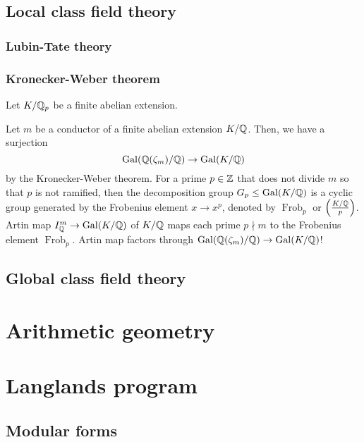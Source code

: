 \documentclass{../note}
\DeclareMathOperator{\Frob}{Frob}
\begin{document}
\chapter{Local class field theory}
\section{Lubin-Tate theory}
\section{Kronecker-Weber theorem}
\begin{prb}
Let $K/\mathbb{Q}_p$ be a finite abelian extension.

\end{prb}







Let $m$ be a conductor of a finite abelian extension $K/\mathbb{Q}$.
Then, we have a surjection
\[\operatorname{Gal}(\mathbb{Q}(\zeta_m)/\mathbb{Q})\to\operatorname{Gal}(K/\mathbb{Q})\]
by the Kronecker-Weber theorem.
For a prime $p\in\mathbb{Z}$ that does not divide $m$ so that $p$ is not ramified, then the decomposition group $G_p\le\operatorname{Gal}(K/\mathbb{Q})$ is a cyclic group generated by the Frobenius element $x\to x^p$, denoted by $\Frob_p$ or $\left(\frac{K/\mathbb{Q}}p\right)$.
Artin map $I_{\mathbb{Q}}^m\to\operatorname{Gal}(K/\mathbb{Q})$ of $K/\mathbb{Q}$ maps each prime $p\nmid m$ to the Frobenius element $\Frob_p$.
Artin map factors through $\operatorname{Gal}(\mathbb{Q}(\zeta_m)/\mathbb{Q})\to\operatorname{Gal}(K/\mathbb{Q})$!


\chapter{Global class field theory}



\chapter{}




\part{Arithmetic geometry}

\part{Langlands program}
\chapter{Modular forms}
\end{document}
